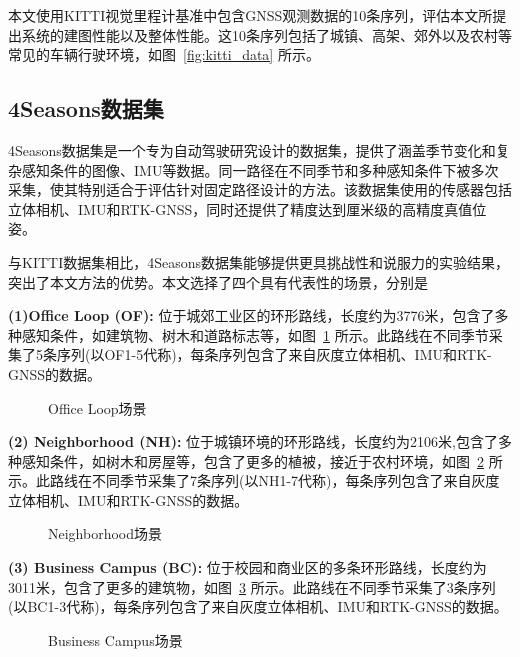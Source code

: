 本文使用KITTI视觉里程计基准中包含GNSS观测数据的10条序列，评估本文所提出系统的建图性能以及整体性能。这10条序列包括了城镇、高架、郊外以及农村等常见的车辆行驶环境，如图~\ref{fig:kitti_data} 所示。

\subsection{4Seasons数据集}
4Seasons数据集\cite{wenzel20214seasons}是一个专为自动驾驶研究设计的数据集，提供了涵盖季节变化和复杂感知条件的图像、IMU等数据。同一路径在不同季节和多种感知条件下被多次采集，使其特别适合于评估针对固定路径设计的方法。该数据集使用的传感器包括立体相机、IMU和RTK-GNSS，同时还提供了精度达到厘米级的高精度真值位姿。

与KITTI数据集相比，4Seasons数据集能够提供更具挑战性和说服力的实验结果，突出了本文方法的优势。本文选择了四个具有代表性的场景，分别是

\textbf{(1)Office Loop (OF):} 位于城郊工业区的环形路线，长度约为3776米，包含了多种感知条件，如建筑物、树木和道路标志等，如图~\ref{fig:OF_data} 所示。此路线在不同季节采集了5条序列(以OF1-5代称)，每条序列包含了来自灰度立体相机、IMU和RTK-GNSS的数据。
\begin{figure}
  \centering
  \caption{Office Loop场景}
  \label{fig:OF_data}
\end{figure}

\textbf{(2) Neighborhood (NH):} 位于城镇环境的环形路线，长度约为2106米,包含了多种感知条件，如树木和房屋等，包含了更多的植被，接近于农村环境，如图~\ref{fig:NH_data} 所示。此路线在不同季节采集了7条序列(以NH1-7代称)，每条序列包含了来自灰度立体相机、IMU和RTK-GNSS的数据。

\begin{figure}
  \centering
  \caption{Neighborhood场景}
  \label{fig:NH_data}
\end{figure}

\textbf{(3) Business Campus (BC):} 位于校园和商业区的多条环形路线，长度约为3011米，包含了更多的建筑物，如图~\ref{fig:BC_data} 所示。此路线在不同季节采集了3条序列(以BC1-3代称)，每条序列包含了来自灰度立体相机、IMU和RTK-GNSS的数据。

\begin{figure}
  \centering
  \caption{Business Campus场景}
  \label{fig:BC_data}
\end{figure}


